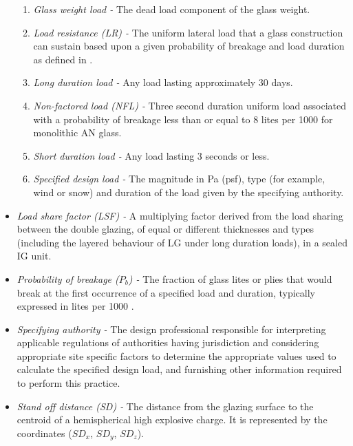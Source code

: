 \documentclass[12pt]{article}
\begin{document}
\begin{itemize}
\begin{enumerate}
\item \textit{Glass weight load -} The dead load component of the glass weight. 
\item \textit{Load resistance (LR) -} The uniform lateral load that a glass 
construction can sustain based upon a given probability of breakage and load 
duration as defined in \cite[(pg. 1, 53)]{ASTM2009}.
\item \textit{Long duration load -} Any load lasting approximately 30 days. 
\item \textit{Non-factored load (NFL) -} Three second duration uniform load 
associated with a probability of breakage less than or equal to 8 lites per 1000 
for monolithic AN glass.
\item \textit{Short duration load -} Any load lasting 3 seconds or less.
\item \textit{Specified design load -} The magnitude in Pa (psf), type (for 
example, wind or snow) and duration of the load given by the specifying authority.

\end{enumerate}

\item \textit{Load share factor (LSF) -} A multiplying factor derived from the 
load sharing between the double glazing, of equal or different thicknesses and 
types (including the layered behaviour of LG under long duration loads), in a 
sealed IG unit.   

\item \textit{Probability of breakage ($P_b$) -} The fraction of glass lites or 
plies that would break at the first occurrence of a specified load and duration, 
typically expressed in lites per 1000 \cite{ASTM2016}.

\item \textit{Specifying authority -} The design professional responsible for 
interpreting applicable regulations of authorities having jurisdiction and 
considering appropriate site specific factors to determine the appropriate 
values used to calculate the specified design load, and furnishing other 
information required to perform this practice.

\item \textit{Stand off distance (SD) -} The distance from the glazing surface to the 
centroid of a hemispherical high explosive charge. It is represented by the coordinates (${SD_{x}}$, ${SD_{y}}$, ${SD_{z}}$).

 

\end{itemize}
\end{document}
